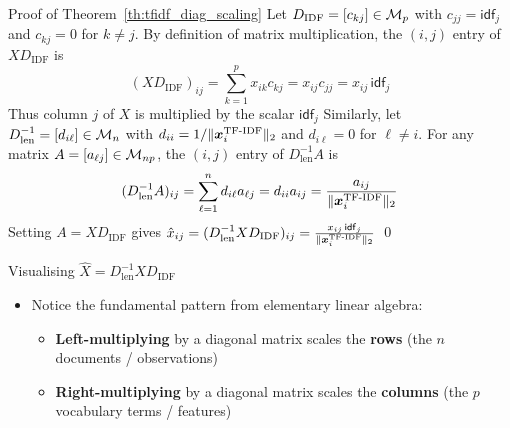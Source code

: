 \documentclass[aspectratio=169]{beamer}\usepackage[]{graphicx}\usepackage[]{xcolor}
\begin{document}
\begin{frame}[red]{Proof of Theorem~\ref{th:tfidf_diag_scaling}}
Let $D_{\text{IDF}} = [c_{kj}] \in \mathcal{M}_p$ with $c_{jj} = \mathsf{idf}_j$ and $c_{kj} = 0$ for $k \neq j$. By definition of matrix multiplication, the $(i,j)$ entry of $X D_{\text{IDF}}$ is
\[
(X D_{\text{IDF}})_{ij} = \sum_{k=1}^p x_{ik} c_{kj} = x_{ij} c_{jj} = x_{ij} \, \mathsf{idf}_j
\]
Thus column $j$ of $X$ is multiplied by the scalar $\mathsf{idf}_j$
\vfill
Similarly, let $D_{\text{len}}^{-1} = [d_{i\ell}] \in \mathcal{M}_n$ with $d_{ii} = 1/\|\bm{x}_i^{\text{TF-IDF}}\|_2$ and $d_{i\ell} = 0$ for $\ell \neq i$. For any matrix $A = [a_{\ell j}] \in \mathcal{M}_{np}$, the $(i,j)$ entry of $D_{\text{len}}^{-1} A$ is
\[
(D_{\text{len}}^{-1} A)_{ij} = \sum_{\ell=1}^n d_{i\ell} a_{\ell j} = d_{ii} a_{ij} = \frac{a_{ij}}{\|\bm{x}_i^{\text{TF-IDF}}\|_2}
\]
Setting $A = X D_{\text{IDF}}$ gives $\hat{x}_{ij} = (D_{\text{len}}^{-1} X D_{\text{IDF}})_{ij} = \frac{x_{ij} \, \mathsf{idf}_j}{\|\bm{x}_i^{\text{TF-IDF}}\|_2}$ \hfill\qed
\end{frame}


\begin{frame}{Visualising $\hat{X} = D_{\text{len}}^{-1} X D_{\text{IDF}}$}
\begin{center}
\end{center}
\vfill
\begin{itemize}
\item Notice the fundamental pattern from elementary linear algebra:
\begin{itemize}
\item \textbf{Left-multiplying} by a diagonal matrix scales the \textbf{rows} (the $n$ documents / observations)
\item \textbf{Right-multiplying} by a diagonal matrix scales the \textbf{columns} (the $p$ vocabulary terms / features)
\end{itemize}
\end{itemize}
\end{frame}
\end{document}
